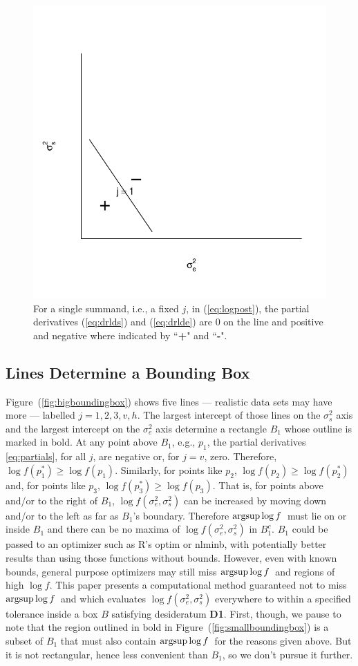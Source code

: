 \documentclass{report}
\newcommand{\textcompute}{\textsf}
\newcommand{\R}{\textcompute{R}\xspace}
\newcommand{\RL}{f}
\newcommand{\logRL}{\log\RL}
\newcommand{\sigssq}{\sigma_s^2}
\newcommand{\sigesq}{\sigma_e^2}
\newcommand{\logRLss}{\logRL(\sigesq,\sigssq)}
\newcommand{\mrle}{$\argsup\log f$}
\newcommand{\argsup}{\operatornamewithlimits{argsup}}
\begin{document}
\begin{figure}[h]
	\centering
	\includegraphics[width=.5\linewidth]{figs/oneline.pdf}
	\caption{For a single summand, i.e., a fixed $j$, in (\ref{eq:logpost}),
	              the partial derivatives (\ref{eq:drlds}) and (\ref{eq:drlde})
	              are 0 on the line and positive and negative where indicated
	              by ``\textbf{+}" and ``\textbf{-}".}
	\label{fig:oneline}
\end{figure}

\subsection{Lines Determine a Bounding Box}
\label{sec:boundingbox}

Figure~(\ref{fig:bigboundingbox}) shows five lines --- realistic data sets may have more --- labelled $j=1, 2, 3, v, h$.  The largest intercept of those lines on the $\sigssq$ axis and the largest intercept on the $\sigesq$ axis determine a rectangle $B_1$ whose outline is marked in bold.  At any point above $B_1$, e.g., $p_1$, the partial derivatives \eqref{eq:partials}, for all $j$, are negative or, for $j=v$, zero.  Therefore, $\logRL(p_1^*) \ge \logRL(p_1)$.  Similarly, for points like $p_2$, $\logRL(p_2) \ge \logRL(p_2^*)$ and, for points like $p_3$, $\logRL(p_3^*) \ge \logRL(p_3)$.  That is, for points above and/or to the right of $B_1$, $\logRLss$ can be increased by moving down and/or to the left as far as $B_1$'s boundary.  Therefore \mrle\ must lie on or inside $B_1$ and there can be no maxima of $\logRLss$ in $B_1^c$.  $B_1$ could be passed to an optimizer such as \R's \textsf{optim} or \textsf{nlminb}, with potentially better results than using those functions without bounds.  However, even with known bounds, general purpose optimizers may still miss \mrle\ and regions of high $\logRL$.  This paper presents a computational method guaranteed not to miss \mrle\ and which evaluates $\logRLss$ everywhere to within a specified tolerance inside a box $B$ satisfying desideratum \textbf{D1}.  First, though, we pause to note that the region outlined in bold in Figure~(\ref{fig:smallboundingbox}) is a subset of $B_1$ that must also contain \mrle\ for the reasons given above.  But it is not rectangular, hence less convenient than $B_1$, so we don't pursue it further.
\end{document}
